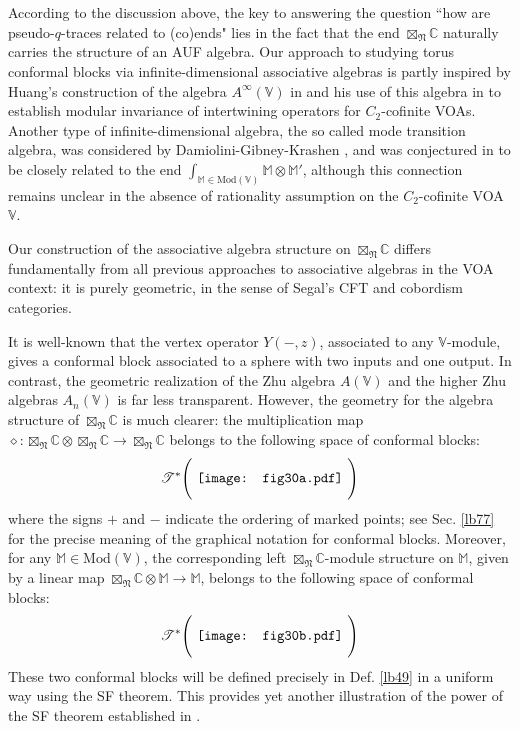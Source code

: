 \documentclass[11pt,b5paper,notitlepage]{article}
\theoremstyle{definition}
\theoremstyle{plain}
\newcommand{\Vbb}{\mathbb V}
\newcommand{\Mbb}{\mathbb M}
\newcommand{\Cbb}{\mathbb C}
\newcommand{\<}{\left\langle}
\renewcommand{\>}{\right\rangle}
\newcommand{\ST}{\mathscr{T}}
\newcommand{\Mod}{\mathrm{Mod}}
\newcommand{\fn}{\mathfrak{N}}
\numberwithin{equation}{section}
\begin{document}
According to the discussion above, the key to answering the question ``how are pseudo-$q$-traces related to (co)ends" lies in the fact that the end $\boxtimes_\fn\Cbb$ naturally carries the structure of an AUF algebra. Our approach to studying torus conformal blocks via infinite-dimensional associative algebras is partly inspired by Huang's construction of the algebra $A^\infty(\Vbb)$ in \cite{Hua-associative,Hua22-Ass-IO} and his use of this algebra in \cite{Hua-modular-C2} to establish modular invariance of intertwining operators for $C_2$-cofinite VOAs. Another type of infinite-dimensional algebra, the so called mode transition algebra, was considered by Damiolini-Gibney-Krashen \cite{DGK2,DGK3-morita}, and was conjectured in \cite{DW-modular-functor} to be closely related to the end $\int_{\Mbb\in\Mod(\Vbb)}\Mbb\otimes\Mbb'$, although this connection remains unclear in the absence of rationality assumption on the $C_2$-cofinite VOA $\Vbb$.


Our construction of the associative algebra structure on $\boxtimes_\fn\Cbb$ differs fundamentally from all previous approaches to associative algebras in the VOA context: it is purely geometric, in the sense of Segal's CFT and cobordism categories. 

It is well-known that the vertex operator $Y(-,z)$, associated to any $\Vbb$-module, gives a conformal block associated to a sphere with two inputs and one output. In contrast, the geometric realization of the Zhu algebra $A(\Vbb)$ and the higher Zhu algebras $A_n(\Vbb)$ is far less transparent. However, the geometry for the algebra structure of $\boxtimes_\fn\Cbb$ is much clearer: the multiplication map $\diamond:\boxtimes_\fn\Cbb\otimes\boxtimes_\fn\Cbb\rightarrow\boxtimes_\fn\Cbb$ belongs to the following space of conformal blocks:
\begin{align}\label{eq143}
\ST^*\Bigg(\vcenter{\hbox{{
		\texttt{[image: fig30a.pdf]}}}}~\Bigg)
\end{align}
where the signs $+$ and $-$ indicate the ordering of marked points; see Sec. \ref{lb77} for the precise meaning of the graphical notation for conformal blocks. Moreover, for any $\Mbb\in\Mod(\Vbb)$, the corresponding left $\boxtimes_\fn\Cbb$-module structure on $\Mbb$, given by a linear map $\boxtimes_\fn\Cbb\otimes\Mbb\rightarrow\Mbb$, belongs to the following space of conformal blocks:
\begin{align}
\ST^*\Bigg(\vcenter{\hbox{{
		\texttt{[image: fig30b.pdf]}}}}~\Bigg)
\end{align}
These two conformal blocks will be defined precisely in Def. \ref{lb49} in a uniform way using the SF theorem. This provides yet another illustration of the power of the SF theorem established in \cite{GZ3}.
\end{document}
